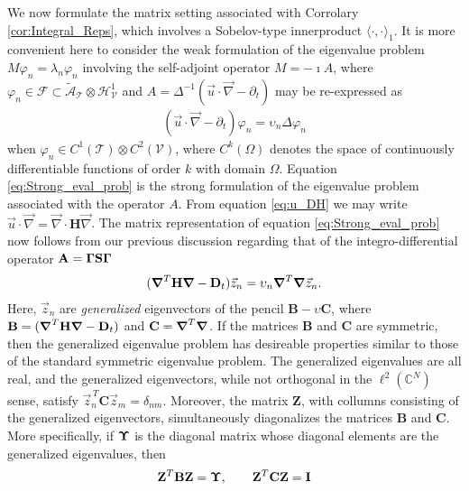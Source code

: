 \documentclass[11pt]{amsart}
\newcommand{\Hb}{\mathbf{H}}
\newcommand{\Ib}{\mathbf{I}}
\newcommand{\Sb}{\mathbf{S}}
\newcommand{\Ab}{\mathbf{A}}
\newcommand{\Bb}{\mathbf{B}}
\newcommand{\Cb}{\mathbf{C}}
\newcommand{\Db}{\mathbf{D}}
\newcommand{\Zb}{\mathbf{Z}}
\newcommand{\Tc}{\mathcal{T}}
\newcommand{\Vc}{\mathcal{V}}
\newcommand{\Hc}{\mathcal{H}}
\newcommand{\Fc}{\mathcal{F}}
\newcommand{\As}{\mathscr{A}}
\newcommand\bGamma{\mbox{\boldmath${\Gamma}$}}
\newcommand\bUpsilon{\mbox{\boldmath${\Upsilon}$}}
\newcommand\Bnabla{\mbox{\boldmath${\nabla}$}}
\begin{document}
We now formulate the matrix setting associated with Corrolary
\ref{cor:Integral_Reps}, which involves a Sobelov-type innerproduct 
$\langle\cdot,\cdot\rangle_1$. It is more convenient here to consider the weak formulation
of the eigenvalue problem $M\varphi_n=\lambda_n\varphi_n$ involving the self-adjoint
operator $M=-\imath A$, where $\varphi_n\in\Fc\subset\tilde{\As}_{\Tc}\otimes\Hc^1_{\Vc}$ and
$A=\Delta^{-1}(\vec{u}\cdot\vec{\nabla}-\partial_t)$ may be re-expressed as 
%
\begin{align}\label{eq:Strong_eval_prob}
  (\vec{u}\cdot\vec{\nabla}-\partial_t)\varphi_n=\upsilon_n\Delta\varphi_n
\end{align}
%
when $\varphi_n\in C^1(\Tc)\otimes C^2(\Vc)$, where $C^k(\Omega)$ denotes the
space of continuously differentiable functions of order $k$ with
domain $\Omega$. Equation \eqref{eq:Strong_eval_prob} is the strong
formulation of the eigenvalue problem associated with the operator $A$.
From equation \eqref{eq:u_DH} we may write
$\vec{u}\cdot\vec{\nabla}=\vec{\nabla}\cdot\Hb\vec{\nabla}$. The matrix representation of
equation \eqref{eq:Strong_eval_prob} now follows from our previous 
discussion regarding that of the integro-differential operator
$\Ab=\bGamma\Sb\bGamma$ 
%
\begin{align}\label{eq:Strong_eval_prob_matrix}
  (\Bnabla^T\Hb\Bnabla-\Db_t)\vec{z}_n=\upsilon_n\Bnabla^T\Bnabla\vec{z}_n.
\end{align}
%
Here, $\vec{z}_n$ are \emph{generalized} eigenvectors of the pencil
$\Bb-\upsilon\Cb$, where $\Bb=(\Bnabla^T\Hb\Bnabla-\Db_t)$ and
$\Cb=\Bnabla^T\Bnabla$. If the matrices $\Bb$ and $\Cb$ 
are symmetric, then the generalized eigenvalue problem has desireable
properties similar to those of the standard symmetric eigenvalue
problem. The generalized eigenvalues are all real, and the generalized
eigenvectors, while not orthogonal in the $\ell^2(\mathbb{C}^N)$ sense,
satisfy $\vec{z}_n^{\,T}\Cb\vec{z}_m=\delta_{nm}$. Moreover, the matrix $\Zb$,
with collumns consisting of the generalized eigenvectors,
simultaneously diagonalizes the matrices $\Bb$ and $\Cb$. More
specifically, if $\bUpsilon$ is the diagonal matrix whose diagonal
elements are the generalized eigenvalues, then
%
\begin{align}
  \Zb^T\Bb\Zb=\bUpsilon, \qquad
  \Zb^T\Cb\Zb=\Ib
\end{align}
%
\end{document}

